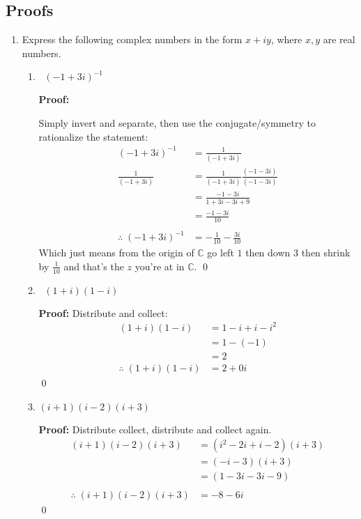 \subsection{Proofs}
\begin{enumerate}
	\item Express the following complex numbers in the form $x + iy$, where $x, y$ are real numbers.
	\begin{enumerate}
		\item $\;\;(-1 + 3i)^{-1}$
		
		\textbf{Proof:}

		Simply invert and separate, then use the conjugate/symmetry to rationalize the statement:
		\begin{align*}
		(-1 + 3i)^{-1} &= \frac{1}{(-1 + 3i)} \\
		\frac{1}{(-1 + 3i)} &= \frac{1}{(-1 + 3i)}\frac{(-1 - 3i)}{(-1 - 3i)} \\
		&= \frac{-1 - 3i}{1 + 3i - 3i + 9} \\
		&= \frac{-1 - 3i}{10} \\
		\\
		\therefore \; (-1 + 3i)^{-1} &= -\frac{1}{10} - \frac{3i}{10}
		\end{align*}
		Which just means from the origin of $\mathbb{C}$ go left $1$ then down $3$ then shrink by $\frac{1}{10}$ and that's the $z$ you're at in $\mathbb{C}.$
		\qed
		
		\item $\;\;(1 + i)(1 - i)$
		
		\textbf{Proof:}
		Distribute and collect:
		\begin{align*}
			(1 + i)(1 - i) &= 1 -i + i - i^2 \\
			&= 1 - (-1) \\
			&= 2 \\
		\therefore \; (1 + i)(1 - i) &= 2 + 0i
		\end{align*}
		\qed
		
		\item $(i + 1)(i - 2)(i + 3)$
		
		\textbf{Proof:}
		Distribute collect, distribute and collect again.
		\begin{align*}
		(i + 1)(i - 2)(i + 3) &= (i^2 -2i + i - 2)(i + 3) \\
		&= (-i - 3)(i + 3) \\
		&= (1 - 3i - 3i - 9) \\
		\\
		\therefore \; (i + 1)(i - 2)(i + 3) &= -8 - 6i
		\end{align*}
		\qed
	\end{enumerate}
	

\end{enumerate}
